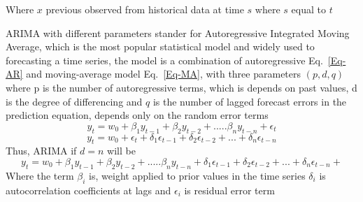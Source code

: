 \documentclass[graybox]{svmult}
\begin{document}
Where \(x\) previous observed from historical data at time \(s\) where \(s\) equal to \(t\)

ARIMA with different parameters 
stander for Autoregressive Integrated Moving Average, which is the most popular statistical model and widely used to forecasting a time series, the model is a combination of  autoregressive Eq.~\ref{Eq-AR} and moving-average model Eq.~\ref{Eq-MA}, with three parameters  \((p,d,q)\) where p is the number of autoregressive terms, which is depends on past values, d is the degree of differencing and  \(q\) is the number of lagged forecast errors in the prediction equation, depends only on the random error terms 
\begin{equation}
 y_t = w_0 +\beta_1 y_{t-1}+ \beta_2 y_{t-2}+.....\beta_n y_{t-n}+\epsilon_t
\label{Eq-AR}
\end{equation}
\begin{equation}
 y_t = w_0 +\epsilon_t + \delta_1 \epsilon_{t-1}+  \delta_2 \epsilon_{t-2}+...+ \delta_n \epsilon_{t-n}
\label{Eq-MA}
\end{equation}
Thus, ARIMA if \(d = n\) will be 
\begin{equation}
 y_t = w_0 +\beta_1 y_{t-1}+ \beta_2 y_{t-2}+.....\beta_n y_{t-n} +  \delta_1 \epsilon_{t-1}+  \delta_2 \epsilon_{t-2}+...+ \delta_n \epsilon_{t-n}+
\label{Eq-ARIMA}
\end{equation}
Where the term \(\beta_i \) is, weight applied to prior values in the time series \(\delta_i \) is autocorrelation coefficients at lags and \(\epsilon_i \) is residual error term 
\end{document}
